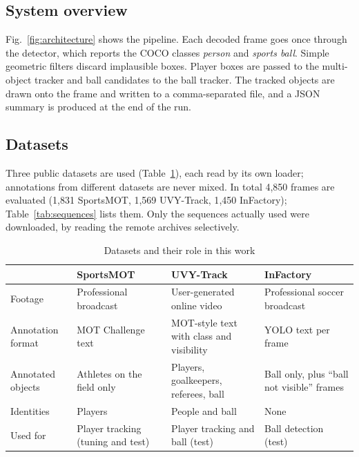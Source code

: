 \documentclass[conference]{IEEEtran}
\begin{document}
\subsection{System overview}
Fig.~\ref{fig:architecture} shows the pipeline. Each decoded frame goes once
through the detector, which reports the COCO classes \emph{person} and
\emph{sports ball}. Simple geometric filters discard implausible boxes. Player
boxes are passed to the multi-object tracker and ball candidates to the ball
tracker. The tracked objects are drawn onto the frame and written to a
comma-separated file, and a JSON summary is produced at the end of the run.

\subsection{Datasets}
\label{sec:datasets}
Three public datasets are used (Table~\ref{tab:datasets}), each read by its own
loader; annotations from different datasets are never mixed. In total
4{,}850 frames are evaluated (1{,}831 SportsMOT, 1{,}569
UVY-Track, 1{,}450 InFactory); Table~\ref{tab:sequences} lists them. Only
the sequences actually used were downloaded, by reading the remote archives
selectively.

\begin{table}[!tp]
\caption{Datasets and their role in this work}
\label{tab:datasets}
\centering
\footnotesize
\begin{tabular}{@{}p{2.5cm}p{4.3cm}p{5.0cm}p{4.4cm}@{}}
\toprule
 & SportsMOT~\cite{sportsmot} & UVY-Track~\cite{uvy} & InFactory~\cite{infactory} \\
\midrule
Footage & Professional broadcast & User-generated online video & Professional soccer broadcast \\
Annotation format & MOT Challenge text & MOT-style text with class and visibility & YOLO text per frame \\
Annotated objects & Athletes on the field only & Players, goalkeepers, referees, ball & Ball only, plus ``ball not visible'' frames \\
Identities & Players & People and ball & None \\
Used for & Player tracking (tuning and test) & Player tracking and ball (test) & Ball detection (test) \\
\bottomrule
\end{tabular}
\end{table}
\end{document}
